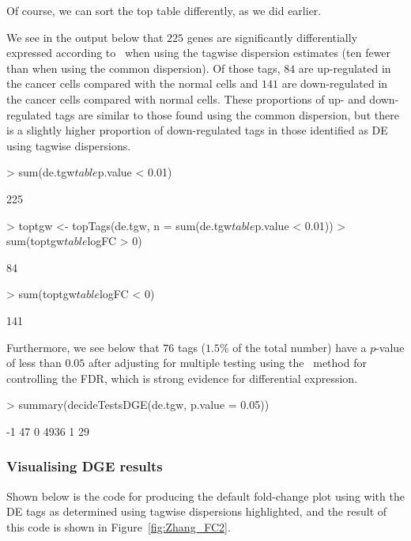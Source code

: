 Of course, we can sort the top table differently, as we did earlier.

We see in the output below that $225$ genes are significantly
differentially expressed according to \edgeR~when using the tagwise
dispersion estimates (ten fewer than when using the common
dispersion). Of those tags, $84$ are up-regulated in the cancer cells
compared with the normal cells and $141$ are down-regulated in the
cancer cells compared with normal cells. These proportions of up- and
down-regulated tags are similar to those found using the common
dispersion, but there is a slightly higher proportion of
down-regulated tags in those identified as DE using tagwise
dispersions.

\begin{Schunk}
\begin{Sinput}
> sum(de.tgw$table$p.value < 0.01)
\end{Sinput}
\begin{Soutput}
[1] 225
\end{Soutput}
\begin{Sinput}
> toptgw <- topTags(de.tgw, n = sum(de.tgw$table$p.value < 0.01))
> sum(toptgw$table$logFC > 0)
\end{Sinput}
\begin{Soutput}
[1] 84
\end{Soutput}
\begin{Sinput}
> sum(toptgw$table$logFC < 0)
\end{Sinput}
\begin{Soutput}
[1] 141
\end{Soutput}
\end{Schunk}

Furthermore, we see below that $76$ tags ($1.5$\% of the total
number) have a $p$-value of less than $0.05$ after adjusting for
multiple testing using the~\citet{Benjamini95} method for controlling
the FDR, which is strong evidence for differential expression.

\begin{Schunk}
\begin{Sinput}
> summary(decideTestsDGE(de.tgw, p.value = 0.05))
\end{Sinput}
\begin{Soutput}
   [,1]
-1   47
0  4936
1    29
\end{Soutput}
\end{Schunk}


\subsubsection{Visualising DGE results}
Shown below is the code for producing the default fold-change plot
using  with the DE tags as determined using tagwise
dispersions highlighted, and the result of this code is shown in
Figure~\ref{fig:Zhang_FC2}.

